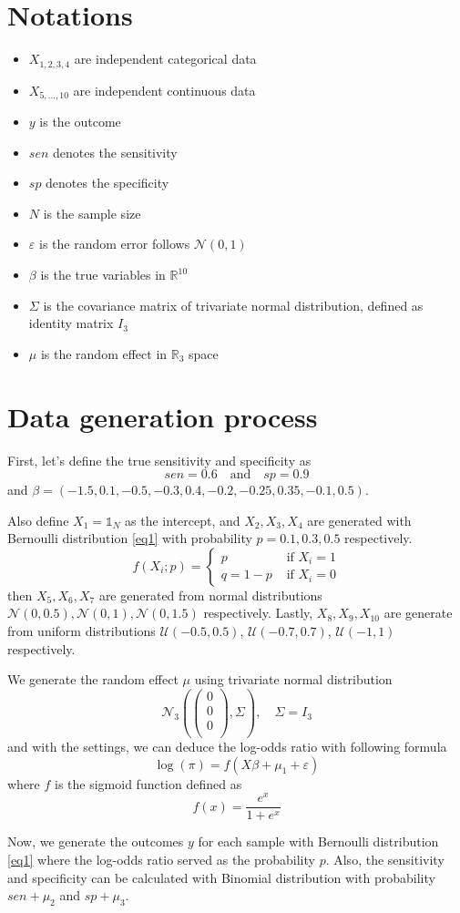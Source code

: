 \documentclass[12pt]{article}
\newcommand{\bigbrac}[1]{\left(#1\right)}
\renewcommand{\epsilon}{\varepsilon}
\theoremstyle{definition}
\theoremstyle{remark}
\begin{document}
\section*{Notations}
\begin{itemize}
	\item $X_{1,2,3,4}$ are independent categorical data
	\item $X_{5,\dots, 10}$ are independent continuous data
	\item $y$ is the outcome\
	\item $sen$ denotes the sensitivity
	\item $sp$ denotes the specificity
	\item $N$ is the sample size\
	\item $\epsilon$ is the random error follows $\mathcal N(0,1)$
	\item $\beta$ is the true variables in $\mathds R^{10}$
	\item $\Sigma$ is the covariance matrix of trivariate normal distribution, defined as identity matrix $I_3$
	\item $\mu$ is the random effect in $\mathds R_3$ space
\end{itemize}
\section*{Data generation process}
First, let's define the true sensitivity and specificity as
\[
sen = 0.6\quad\text{and}\quad sp = 0.9
\]
and $\beta=(-1.5,0.1,-0.5,-0.3,0.4,-0.2,-0.25,0.35,-0.1,0.5)$.

Also define $X_1=\mathbb{1}_N$ as the intercept, and $X_2,X_3,X_4$ are generated with Bernoulli distribution \eqref{eq1} with  probability $p=0.1,0.3,0.5$ respectively.
\begin{equation}\label{eq1}
	f(X_i ; p)=\left\{\begin{array}{ll}
p & \text { if } X_i=1 \\
q=1-p & \text { if } X_i=0
\end{array}\right.
\end{equation}
then $X_5, X_6, X_7$ are generated from normal distributions $\mathcal N(0,0.5),\mathcal N(0,1),\mathcal N(0,1.5)$ respectively. Lastly, $X_8, X_9, X_{10}$ are generate from uniform distributions $\mathcal U(-0.5,0.5)$, $\mathcal U(-0.7,0.7)$, $\mathcal U(-1,1)$ respectively.

We generate the random effect $\mu$ using trivariate normal distribution 
\begin{equation}
	\mathcal N_3\bigbrac{\bigbrac{\begin{array}{ccc}
		0\\0\\0\\
	\end{array}}, \Sigma}, \quad\Sigma=I_3
\end{equation}
and with the settings, we can deduce the log-odds ratio with following formula
\begin{equation}
\log(\pi)=f(X\beta +\mu_1+\epsilon)
\end{equation}
where $f$ is the sigmoid function defined as
\begin{equation}
f(x)=\dfrac{e^x}{1+e^x}
\end{equation}

Now, we generate the outcomes $y$ for each sample with Bernoulli distribution \eqref{eq1} where the log-odds ratio served as the probability $p$.
Also, the sensitivity and specificity can be calculated with Binomial distribution with probability $sen+\mu_2$ and $sp+\mu_3$.
\end{document}
